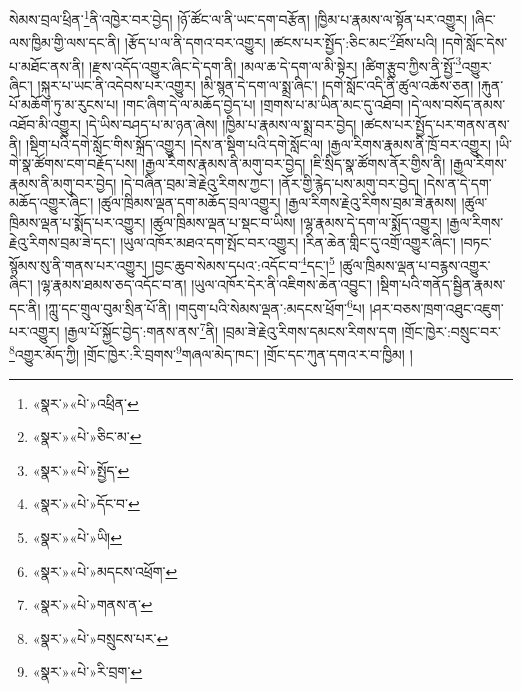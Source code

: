 སེམས་བྲལ་ཕྲིན་\footnote{«སྣར་»«པེ་»འཕྲིན་}ནི་འཁྱེར་བར་བྱེད། །ཉོ་ཚོང་ལ་ནི་ཡང་དག་བརྩོན། །ཁྱིམ་པ་རྣམས་ལ་སྟོན་པར་འགྱུར། །ཞིང་ལས་ཁྱིམ་གྱི་ལས་དང་ནི། །རྩོད་པ་ལ་ནི་དགའ་བར་འགྱུར། །ཚངས་པར་སྤྱོད་:ཅིང་མང་\footnote{«སྣར་»«པེ་»ཅིང་མ་}ཐོས་པའི། །དགེ་སློང་དེས་པ་མཐོང་ནས་ནི། །རྫས་འདོད་འགྱུར་ཞིང་དེ་དག་ནི། །མལ་ཆ་དེ་དག་ལ་མི་སྟེར། །ཚིག་རྩུབ་ཀྱིས་ནི་སྤྱོ་\footnote{«སྣར་»«པེ་»སྤྱོད་}འགྱུར་ཞིང་། །སྐུར་པ་ཡང་ནི་འདེབས་པར་འགྱུར། །མི་སྙན་དེ་དག་ལ་སྨྲ་ཞིང་། །དགེ་སློང་འདི་ནི་ཚུལ་འཆོས་ཅན། །རྐུན་པོ་མཆོག་ཏུ་མ་རུངས་པ། །གང་ཞིག་དེ་ལ་མཆོད་བྱེད་པ། །གྲགས་པ་མ་ཡིན་མང་དུ་འཐོབ། །དེ་ལས་བསོད་ནམས་འཐོབ་མི་འགྱུར། །དེ་ཡིས་བཤད་པ་མ་ཉན་ཞེས། །ཁྱིམ་པ་རྣམས་ལ་སྨྲ་བར་བྱེད། །ཚངས་པར་སྤྱོད་པར་གནས་ནས་ནི། །སྡིག་པའི་དགེ་སློང་གིས་སྐྲོད་འགྱུར། །དེས་ན་སྡིག་པའི་དགེ་སློང་ལ། །རྒྱལ་རིགས་རྣམས་ནི་ཁྲོ་བར་འགྱུར། །ཡི་གེ་སྣ་ཚོགས་ངག་བརྗོད་པས། །རྒྱལ་རིགས་རྣམས་ནི་མགུ་བར་བྱེད། །ཇི་སྲིད་སྣ་ཚོགས་ནོར་གྱིས་ནི། །རྒྱལ་རིགས་རྣམས་ནི་མགུ་བར་བྱེད། །དེ་བཞིན་བྲམ་ཟེ་རྗེའུ་རིགས་ཀྱང་། །ནོར་གྱི་རྙེད་པས་མགུ་བར་བྱེད། །དེས་ན་དེ་དག་མཆོད་འགྱུར་ཞིང་། །ཚུལ་ཁྲིམས་ལྡན་དག་མཆོད་བྲལ་འགྱུར། །རྒྱལ་རིགས་རྗེའུ་རིགས་བྲམ་ཟེ་རྣམས། །ཚུལ་ཁྲིམས་ལྡན་པ་སྨོད་པར་འགྱུར། །ཚུལ་ཁྲིམས་ལྡན་པ་སྡང་བ་ཡིས། །ལྷ་རྣམས་དེ་དག་ལ་སྨོད་འགྱུར། །རྒྱལ་རིགས་རྗེའུ་རིགས་བྲམ་ཟེ་དང་། །ཡུལ་འཁོར་མཐའ་དག་སྤོང་བར་འགྱུར། །རིན་ཆེན་གླིང་དུ་འགྲོ་འགྱུར་ཞིང་། །བཏང་སྙོམས་སུ་ནི་གནས་པར་འགྱུར། །བྱང་ཆུབ་སེམས་དཔའ་:འདོང་བ་\footnote{«སྣར་»«པེ་»དོང་བ་}དང་།\footnote{«སྣར་»«པེ་»ཡི།} །ཚུལ་ཁྲིམས་ལྡན་པ་བརྙས་འགྱུར་ཞིང་། །ལྷ་རྣམས་ཐམས་ཅད་འདོང་བ་ན། །ཡུལ་འཁོར་དེར་ནི་འཇིགས་ཆེན་འབྱུང་། །སྡིག་པའི་གནོད་སྦྱིན་རྣམས་དང་ནི། །ཀླུ་དང་གྲུལ་བུམ་སྲིན་པོ་ནི། །གདུག་པའི་སེམས་ལྡན་:མདངས་ཕྲོག་\footnote{«སྣར་»«པེ་»མདངས་འཕྲོག་}པ། །ཤར་བཅས་ཁྲག་འཐུང་འཇུག་པར་འགྱུར། །རྒྱལ་པོ་སྐྱོང་བྱེད་:གནས་ནས་\footnote{«སྣར་»«པེ་»གནས་ན་}ནི། །བྲམ་ཟེ་རྗེའུ་རིགས་དམངས་རིགས་དག །གྲོང་ཁྱེར་:བསྲུང་བར་\footnote{«སྣར་»«པེ་»བསྲུངས་པར་}འགྱུར་མོད་ཀྱི། །གྲོང་ཁྱེར་:རི་བྲགས་\footnote{«སྣར་»«པེ་»རི་བྲག་}གཞལ་མེད་ཁང་། །གྲོང་དང་ཀུན་དགའ་ར་བ་ཁྱིམ། །
